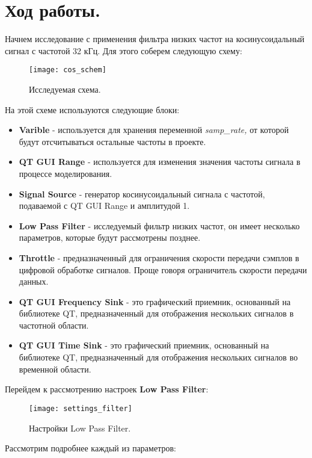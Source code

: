 \documentclass[a4paper,12pt]{extarticle}
\begin{document}
\section{Ход работы.}
Начнем исследование с применения фильтра низких частот на косинусоидальный сигнал с частотой 32 кГц.
Для этого соберем следующую схему:\\
\begin{figure}[H]
    \centering
    \texttt{[image: cos\_schem]}
    \caption{Исследуемая схема.} %
    \label{fig:cos_schem} %
\end{figure}
На этой схеме используются следующие блоки:
\begin{itemize}[nolistsep]
    \item \textbf{Varible} - используется для хранения переменной \textit{samp\_rate,} 
    от которой будут отсчитываться остальные частоты в проекте.
    \item \textbf{QT GUI Range} - используется для изменения значения частоты сигнала
    в процессе моделирования.
    \item \textbf{Signal Source} - генератор косинусоидальный сигнала с частотой, подаваемой
    с QT GUI Range и амплитудой 1.
    \item \textbf{Low Pass Filter} - исследуемый фильтр низких частот, он имеет несколько параметров, 
    которые будут рассмотрены позднее. 
    \item \textbf{Throttle} - предназначенный для ограничения скорости передачи сэмплов в цифровой 
    обработке сигналов. Проще говоря ограничитель скорости передачи данных. 
    \item \textbf{QT GUI Frequency Sink} - это графический приемник, основанный на библиотеке QT, 
    предназначенный для отображения нескольких сигналов в частотной области. 
    \item \textbf{QT GUI Time Sink} - это графический приемник, основанный на библиотеке QT, 
    предназначенный для отображения нескольких сигналов во временной области. 
\end{itemize}
Перейдем к рассмотрению настроек \textbf{Low Pass Filter}:\\
\begin{figure}[H]
    \centering
    \texttt{[image: settings\_filter]}
    \caption{Настройки Low Pass Filter.} %
    \label{fig:settings_filter} %
\end{figure}
Рассмотрим подробнее каждый из параметров:
\end{document}
